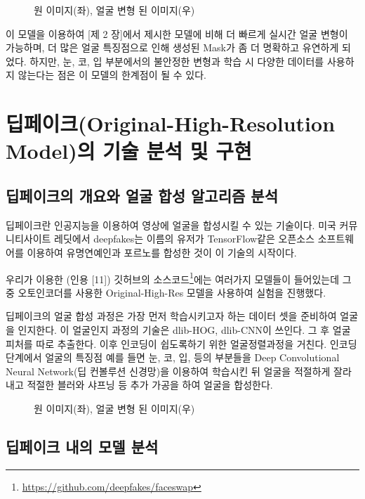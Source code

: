 \documentclass{oblivoir}
\begin{document}
\begin{figure}[h!]
\centering
\caption{원 이미지(좌), 얼굴 변형 된 이미지(우)}
\end{figure}



이 모델을 이용하여 [제 2 장]에서 제시한 모델에 비해 더 빠르게 실시간 얼굴 변형이 가능하며, 더 많은 얼굴 특징점으로 인해 생성된 Mask가 좀 더 명확하고 유연하게 되었다. 하지만, 눈, 코, 입 부분에서의 불안정한 변형과 학습 시 다양한 데이터를 사용하지 않는다는 점은 이 모델의 한계점이 될 수 있다.

\chapter{딥페이크(Original-High-Resolution Model)의 기술 분석 및 구현}

\section{ 딥페이크의 개요와 얼굴 합성 알고리즘 분석}

딥페이크란 인공지능을 이용하여 영상에 얼굴을 합성시킬 수 있는 기술이다. 미국 커뮤니티사이트 레딧에서 deepfakes는 이름의 유저가 TensorFlow같은 오픈소스 소프트웨어를 이용하여 유명연예인과 포르노를 합성한 것이 이 기술의 시작이다.

우리가 이용한 (인용 [11]) 깃허브의 소스코드\footnote{\protect\url{https://github.com/deepfakes/faceswap}}에는 여러가지 모델들이 들어있는데 그 중 오토인코더를 사용한 Original-High-Res 모델을 사용하여 실험을 진행했다.

딥페이크의 얼굴 합성 과정은 가장 먼저 학습시키고자 하는 데이터 셋을 준비하여 얼굴을 인지한다. 이 얼굴인지 과정의 기술은 dlib-HOG, dlib-CNN이 쓰인다. 그 후 얼굴 피처를 따로 추출한다. 이후 인코딩이 쉽도록하기 위한 얼굴정렬과정을 거친다. 인코딩 단계에서 얼굴의 특징점 예를 들면 눈, 코, 입, 등의 부분들을 Deep Convolutional Neural Network(딥 컨볼루션 신경망)을 이용하여 학습시킨 뒤 얼굴을 적절하게 잘라내고 적절한 블러와 샤프닝 등 추가 가공을 하여 얼굴을 합성한다.


\begin{figure}[h!]
\centering
\caption{원 이미지(좌), 얼굴 변형 된 이미지(우)}
\end{figure}


\section{ 딥페이크 내의 모델 분석}
\end{document}
